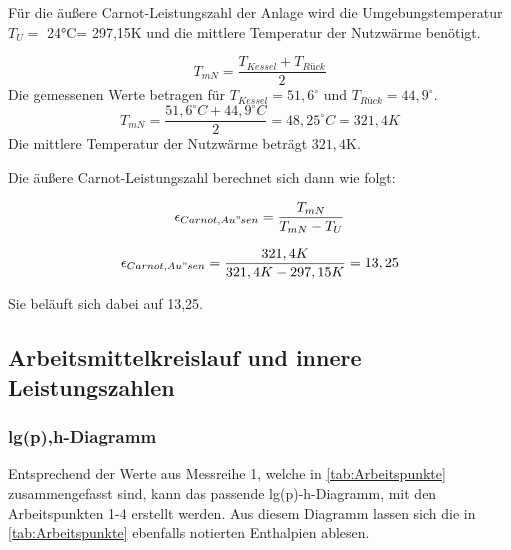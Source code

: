 Für die äußere Carnot-Leistungszahl der Anlage wird die Umgebungstemperatur $T_{U}=$ 24°C= 297,15K und die mittlere Temperatur der Nutzwärme benötigt.

\begin{equation}
T_{mN}= \frac{T_{Kessel}+T_{Rück}}{2}
\end{equation}
Die gemessenen Werte betragen für $T_{Kessel}=51,6^\circ$ und $T_{Rück}= 44,9^\circ$.
$$T_{mN}=\frac{51,6^{\circ}C+44,9^{\circ}C}{2}=48,25^{\circ}C= 321,4 K$$
Die mittlere Temperatur der Nutzwärme beträgt $321,4$K.

Die äußere Carnot-Leistungszahl berechnet sich dann wie folgt: 

\begin{equation}
\epsilon_{Carnot, Au"sen} = \frac{T_{mN}}{T_{mN}-T_{U}}
\label{eq:110623_aeußere Carnot Leistungszahl}
\end{equation}

$$\epsilon_{Carnot, Au"sen} = \frac{321,4 K}{321,4 K-297,15K} = 13,25$$

Sie beläuft sich dabei auf 13,25.
\newpage
\subsection{Arbeitsmittelkreislauf und innere Leistungszahlen}
\subsubsection{lg(p),h-Diagramm}
Entsprechend der Werte aus Messreihe 1, welche in \autoref{tab:Arbeitspunkte} zusammengefasst sind, kann das passende
lg(p)-h-Diagramm, mit den Arbeitspunkten 1-4 erstellt werden. Aus diesem Diagramm lassen sich die in \autoref{tab:Arbeitspunkte} ebenfalls
notierten Enthalpien ablesen.

